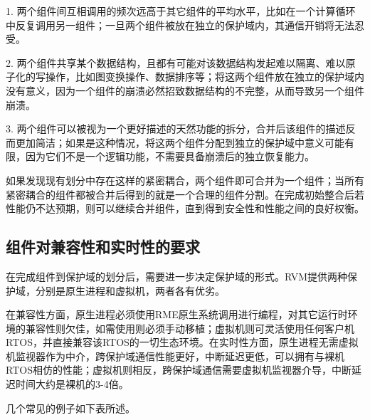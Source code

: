 1.
两个组件间互相调用的频次远高于其它组件的平均水平，比如在一个计算循环中反复调用另一组件；一旦两个组件被放在独立的保护域内，其通信开销将无法忍受。

2.
两个组件共享某个数据结构，且都有可能对该数据结构发起难以隔离、难以原子化的写操作，比如图变换操作、数据排序等；将这两个组件放在独立的保护域内没有意义，因为一个组件的崩溃必然招致数据结构的不完整，从而导致另一个组件崩溃。

3.
两个组件可以被视为一个更好描述的天然功能的拆分，合并后该组件的描述反而更加简洁；如果是这种情况，将这两个组件分配到独立的保护域中意义可能有限，因为它们不是一个逻辑功能，不需要具备崩溃后的独立恢复能力。

如果发现现有划分中存在这样的紧密耦合，两个组件即可合并为一个组件；当所有紧密耦合的组件都被合并后得到的就是一个合理的组件分割。在完成初始整合后若性能仍不达预期，则可以继续合并组件，直到得到安全性和性能之间的良好权衡。

\subsection{组件对兼容性和实时性的要求}\label{subsec:6-2-2}

在完成组件到保护域的划分后，需要进一步决定保护域的形式。RVM提供两种保护域，分别是原生进程和虚拟机，两者各有优劣。

在兼容性方面，原生进程必须使用RME原生系统调用进行编程，对其它运行时环境的兼容性则欠佳，如需使用则必须手动移植；虚拟机则可灵活使用任何客户机RTOS，并直接兼容该RTOS的一切生态环境。在实时性方面，原生进程无需虚拟机监视器作为中介，跨保护域通信性能更好，中断延迟更低，可以拥有与裸机RTOS相仿的性能；虚拟机则相反，跨保护域通信需要虚拟机监视器介导，中断延迟时间大约是裸机的3-4倍。

几个常见的例子如下表所述。

